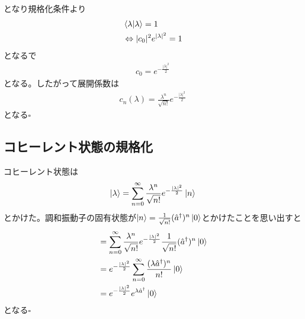 \documentclass{jsarticle}  %
\numberwithin{equation}{section} %
\numberwithin{figure}{section}
\begin{document}
    となり規格化条件より
    \begin{align}
        &\braket{\lambda|\lambda} = 1 \notag \\
        &\Leftrightarrow |c_0|^2 e^{|\lambda|^2} = 1\notag \\
    \end{align}
    となるで
    \begin{align}
        c_0 = e^{-\frac{|\lambda|^2}{2} }
    \end{align}
    となる。したがって展開係数は
    \begin{align}
        c_n(\lambda) = \frac{\lambda^n}{\sqrt{n!}} e^{-\frac{|\lambda|^2}{2} }
    \end{align}
    となる$\square$
\subsection{コヒーレント状態の規格化}
    コヒーレント状態は
    \begin{align}
        \ket{\lambda} = \sum_{n=0}^\infty \frac{\lambda^n}{\sqrt{n!}} e^{-\frac{|\lambda|^2}{2} } \ket{n}
    \end{align}
    とかけた。調和振動子の固有状態が$\ket{n} = \frac{1}{\sqrt{n!}}(\hat{a}^{\dagger})^n \ket{0}$とかけたことを思い出すと
    \begin{align}
        &= \sum_{n=0}^\infty \frac{\lambda^n}{\sqrt{n!}} e^{-\frac{|\lambda|^2}{2} } \frac{1}{\sqrt{n!}}(\hat{a}^{\dagger})^n \ket{0} \notag \\
        &= e^{-\frac{|\lambda|^2}{2} } \sum_{n=0}^\infty \frac{(\lambda\hat{a}^{\dagger})^n}{n!} \ket{0} \notag \\
        &= e^{-\frac{|\lambda|^2}{2} } e^{\lambda \hat{a}^\dagger} \ket{0}
    \end{align}
    となる$\square$
\end{document}
